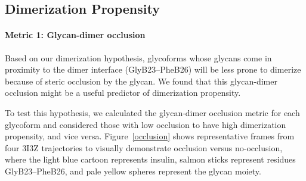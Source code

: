 \documentclass[9pt]{elife}
\providecommand{\DIFdelbegin}{} %
\providecommand{\DIFdelend}{} %
\begin{document}
\DIFdelbegin %

\DIFdelend \subsection{Dimerization Propensity}
\paragraph{Metric 1: Glycan-dimer occlusion}
Based on our dimerization hypothesis, glycoforms whose glycans come in proximity to the dimer interface (GlyB23--PheB26) will be less prone to dimerize because of steric occlusion by the glycan. We found that this glycan-dimer occlusion might be a useful predictor of dimerization propensity. 

To test this hypothesis, we calculated the glycan-dimer occlusion metric for each glycoform and considered those with low occlusion to have high dimerization propensity, and vice versa. Figure~\ref{occlusion} shows representative frames from four 3I3Z trajectories to visually demonstrate occlusion versus no-occlusion, where the light blue cartoon represents insulin, salmon sticks represent residues GlyB23--PheB26, and pale yellow spheres represent the glycan moiety. 
\end{document}

